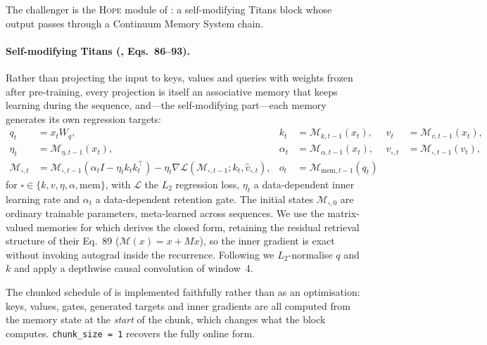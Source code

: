 \documentclass[11pt,a4paper]{article}
\newcommand{\code}[1]{\texttt{\small #1}}
\begin{document}
The challenger is the \textsc{Hope} module of \cite[\S8.3]{behrouz2025nested}: a
self-modifying Titans block whose output passes through a Continuum Memory
System chain.

\paragraph{Self-modifying Titans (\cite[\S8.1--8.2]{behrouz2025nested}, Eqs.\
86--93).} Rather than projecting the input to keys, values and queries with
weights frozen after pre-training, every projection is itself an associative
memory that keeps learning during the sequence, and---the self-modifying
part---each memory generates its own regression targets:
\begin{align}
q_t &= x_t W_q, &
k_t &= \mathcal{M}_{k,t-1}(x_t), &
v_t &= \mathcal{M}_{v,t-1}(x_t), \\
\eta_t &= \mathcal{M}_{\eta,t-1}(x_t), &
\alpha_t &= \mathcal{M}_{\alpha,t-1}(x_t), &
\hat v_{\square,t} &= \mathcal{M}_{\square,t-1}(v_t), \\
\mathcal{M}_{\square,t} &= \mathcal{M}_{\square,t-1}
   \left(\alpha_t I - \eta_t k_t k_t^{\!\top}\right)
   - \eta_t \nabla \mathcal{L}\!\left(\mathcal{M}_{\square,t-1};k_t,\hat v_{\square,t}\right),
   & o_t &= \mathcal{M}_{\mathrm{mem},t-1}(q_t)
\label{eq:titans}
\end{align}
for $\square\in\{k,v,\eta,\alpha,\mathrm{mem}\}$, with $\mathcal{L}$ the $L_2$
regression loss, $\eta_t$ a data-dependent inner learning rate and $\alpha_t$ a
data-dependent retention gate. The initial states $\mathcal{M}_{\square,0}$ are
ordinary trainable parameters, meta-learned across sequences. We use the
matrix-valued memories for which \cite[Eq.~93]{behrouz2025nested} derives the
closed form, retaining the residual retrieval structure of their Eq.~89
($\mathcal{M}(x) = x + Mx$), so the inner gradient is exact without invoking
autograd inside the recurrence. Following \cite[\S8.3]{behrouz2025nested} we
$L_2$-normalise $q$ and $k$ and apply a depthwise causal convolution of window~4.

The chunked schedule of \cite[\S8.2]{behrouz2025nested} is implemented
faithfully rather than as an optimisation: keys, values, gates, generated
targets and inner gradients are all computed from the memory state at the
\emph{start} of the chunk, which changes what the block computes.
\code{chunk\_size = 1} recovers the fully online form.
\end{document}
